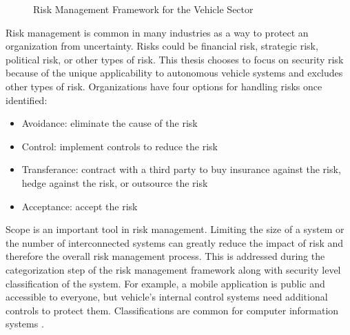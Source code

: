\documentclass{article}
\begin{document}
\begin{figure}[h] \centering
{}
    \caption{Risk Management Framework for the Vehicle Sector \citep{mccarthy_national_2014}}
\label{figure:mccarthy_national_2014}
\end{figure}

Risk management is common in many industries as a way to protect an organization from uncertainty. Risks could be financial risk, strategic risk, political risk, or other types of risk. This thesis chooses to focus on security risk because of the unique applicability to autonomous vehicle systems and excludes other types of risk. Organizations have four options for handling risks once identified:
\begin{itemize}
    \item Avoidance: eliminate the cause of the risk
    \item Control: implement controls to reduce the risk
    \item Transferance: contract with a third party to buy insurance against the risk, hedge against the risk, or outsource the risk
    \item Acceptance: accept the risk
\end{itemize}
Scope is an important tool in risk management. Limiting the size of a system or the number of interconnected systems can greatly reduce the impact of risk and therefore the overall risk management process. This is addressed during the categorization step of the risk management framework along with security level classification of the system. For example, a mobile application is public and accessible to everyone, but vehicle's internal control systems need additional controls to protect them. Classifications are common for computer information systems \citep{markiewicz_guidelines_2015, stanford_university_it_risk_}.
\end{document}
